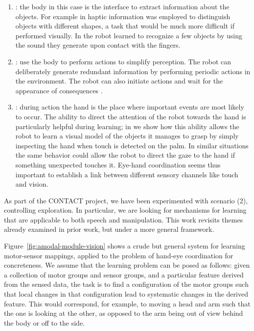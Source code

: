\liststyleLiii
\begin{enumerate}
\item {}: the body in this case is
the interface to extract information about the objects. For example in
\citep{natale04learning} haptic information was employed to distinguish objects
with different shapes, a task that would be much more difficult if
performed visually. In
\citep{torres-jara05tapping} the robot learned to recognize a few objects by using
the sound they generate upon contact with the fingers. 
\item {}: use the body to
perform actions to simplify perception. The robot can deliberately
generate redundant information by performing periodic actions in the
environment. The robot can also initiate actions and wait for the
appearance of consequences
\citep{fitzpatrick03grounding}. 
\item {}: during action
the hand is the place where important events are most likely to occur.
The ability to direct the attention of the robot towards the hand is
particularly helpful during learning; in
\citep{natale05exploring} we show how this ability allows the robot to learn a
visual model of the objects it manages to grasp by simply inspecting
the hand when touch is detected on the palm. 
%
In similar situations the same behavior could allow the robot to
direct the gaze to the hand if something unexpected touches
it. Eye-hand coordination seems thus important to establish a link
between different sensory channels like touch and vision.
\end{enumerate}



As part of the CONTACT project, we have been experimented with scenario (2),
controlling exploration.  In particular, we are looking for mechanisms for
learning that are applicable to both speech and
manipulation.
%
This work revisits themes already examined in prior work, but under a
more general framework.

Figure~\ref{fig:amodal-module-vision} shows a crude but general system
for learning motor-sensor mappings, applied to the problem of hand-eye
coordination for concreteness.  We assume that the learning problem
can be posed as follows: given a collection of motor groups and sensor
groups, and a particular feature derived from the sensed data, the
task is to find a configuration of the motor groups such that local
changes in that configuration lead to systematic changes in the
derived feature.  This would correspond, for example, to moving 
a head and arm such that the one is looking at the other, as opposed to
the arm being out of view behind the body or off to the side.

